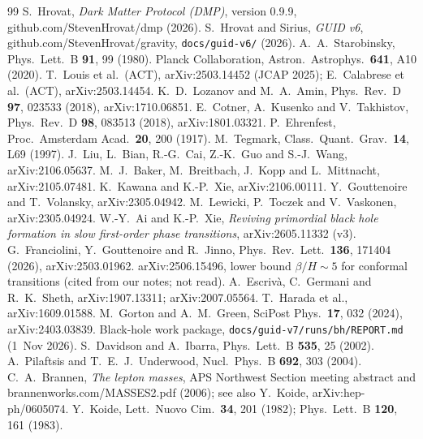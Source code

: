 \documentclass[11pt,a4paper]{article}
\begin{document}
\begin{thebibliography}{99}\small
{} S.~Hrovat, \emph{Dark Matter Protocol (DMP)}, version 0.9.9, github.com/StevenHrovat/dmp (2026).
 S.~Hrovat and Sirius, \emph{GUID v6}, github.com/StevenHrovat/gravity, \texttt{docs/guid-v6/} (2026).
 A.~A.~Starobinsky, Phys.\ Lett.\ B \textbf{91}, 99 (1980).
 Planck Collaboration, Astron.\ Astrophys.\ \textbf{641}, A10 (2020).
 T.~Louis et al.\ (ACT), arXiv:2503.14452 (JCAP 2025); E.~Calabrese et al.\ (ACT), arXiv:2503.14454.
 K.~D.~Lozanov and M.~A.~Amin, Phys.\ Rev.\ D \textbf{97}, 023533 (2018), arXiv:1710.06851.
 E.~Cotner, A.~Kusenko and V.~Takhistov, Phys.\ Rev.\ D \textbf{98}, 083513 (2018), arXiv:1801.03321.
 P.~Ehrenfest, Proc.\ Amsterdam Acad.\ \textbf{20}, 200 (1917).
 M.~Tegmark, Class.\ Quant.\ Grav.\ \textbf{14}, L69 (1997).
 J.~Liu, L.~Bian, R.-G.~Cai, Z.-K.~Guo and S.-J.~Wang, arXiv:2106.05637.
 M.~J.~Baker, M.~Breitbach, J.~Kopp and L.~Mittnacht, arXiv:2105.07481.
 K.~Kawana and K.-P.~Xie, arXiv:2106.00111.
 Y.~Gouttenoire and T.~Volansky, arXiv:2305.04942.
 M.~Lewicki, P.~Toczek and V.~Vaskonen, arXiv:2305.04924.
 W.-Y.~Ai and K.-P.~Xie, \emph{Reviving primordial black hole formation in slow first-order phase transitions}, arXiv:2605.11332 (v3).
 G.~Franciolini, Y.~Gouttenoire and R.~Jinno, Phys.\ Rev.\ Lett.\ \textbf{136}, 171404 (2026), arXiv:2503.01962.
 arXiv:2506.15496, lower bound $\beta/H\sim5$ for conformal transitions (cited from our notes; not read).
 A.~Escriv\`a, C.~Germani and R.~K.~Sheth, arXiv:1907.13311; arXiv:2007.05564.
 T.~Harada et al., arXiv:1609.01588.
 M.~Gorton and A.~M.~Green, SciPost Phys.\ \textbf{17}, 032 (2024), arXiv:2403.03839.
 Black-hole work package, \texttt{docs/guid-v7/runs/bh/REPORT.md} (1~Nov 2026).
 S.~Davidson and A.~Ibarra, Phys.\ Lett.\ B \textbf{535}, 25 (2002).
 A.~Pilaftsis and T.~E.~J.~Underwood, Nucl.\ Phys.\ B \textbf{692}, 303 (2004).
 C.~A.~Brannen, \emph{The lepton masses}, APS Northwest Section meeting abstract and brannenworks.com/MASSES2.pdf (2006);
see also Y.~Koide, arXiv:hep-ph/0605074.
 Y.~Koide, Lett.\ Nuovo Cim.\ \textbf{34}, 201 (1982); Phys.\ Lett.\ B \textbf{120}, 161 (1983).

\end{thebibliography}
\end{document}
